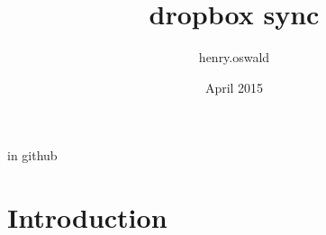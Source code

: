 \documentclass{article}
\title{dropbox sync}
\author{henry.oswald }
\date{April 2015}
\begin{document}
\maketitle
in github
\section{Introduction}
\end{document}
